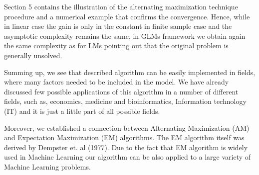 \par Section 5 contains the illustration of the alternating maximization technique  procedure and a numerical example that confirms the convergence. Hence, while in linear case the gain is only in the constant in finite sample case and the asymptotic complexity remains the same, in GLMs framework we obtain again the same complexity as for LMs pointing out that the original problem is generally unsolved. 
\par Summing up, we see that described algorithm can be easily implemented in fields, where many factors needed to be included in the model. We have already discussed few possible applications of this algorithm in a number of different fields, such as, economics, medicine and bioinformatics, Information technology (IT) and it is just a little part of all possible fields. 
\par Moreover, we established a connection between Alternating Maximization (AM) and Expectation Maximization (EM) algorithms. The EM algorithm itself was derived by Dempster et. al (1977). Due to the fact that EM algorithm is widely used in Machine Learning our algorithm can be also applied to a large variety of Machine Learning problems.